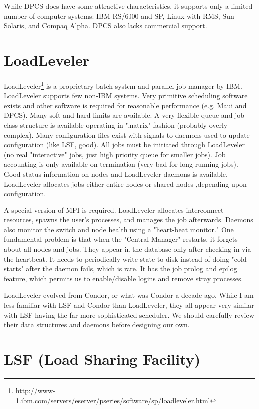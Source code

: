 \documentclass{article}
\begin{document}
While DPCS does have some attractive characteristics, it supports only a 
limited number of computer systems: IBM RS/6000 and SP, Linux with RMS, 
Sun Solaris, and Compaq Alpha. DPCS also lacks commercial support.

\section{LoadLeveler}

LoadLeveler\footnote{
http://www-1.ibm.com/servers/eserver/pseries/software/sp/loadleveler.html}
is a proprietary batch system and parallel job manager by 
IBM. LoadLeveler supports few non-IBM systems. Very primitive 
scheduling software exists and other software is required for reasonable 
performance (e.g. Maui and DPCS). Many soft and hard limits are available. 
A very flexible queue and job class structure is available operating in "matrix" fashion 
(probably overly complex). Many configuration files exist with signals to 
daemons used to update configuration (like LSF, good). All jobs must 
be initiated through LoadLeveler (no real "interactive" jobs, just 
high priority queue for smaller jobs). Job accounting is only available 
on termination (very bad for long-running jobs). Good status 
information on nodes and LoadLeveler daemons is available. LoadLeveler 
allocates jobs either entire nodes or shared nodes ,depending upon configuration.

A special version of MPI is required. LoadLeveler allocates 
interconnect resources, spawns the user's processes, and manages the 
job afterwards. Daemons also monitor the switch and node health using 
a "heart-beat monitor." One fundamental problem is that when the 
"Central Manager" restarts, it forgets about all nodes and jobs. They 
appear in the database only after checking in via the heartbeat. It 
needs to periodically write state to disk instead of doing 
"cold-starts" after the daemon fails, which is rare. It has the job 
prolog and epilog feature, which permits us to enable/disable logins 
and remove stray processes.

LoadLeveler evolved from Condor, or what was Condor a decade ago. 
While I am less familiar with LSF and Condor than LoadLeveler, they 
all appear very similar with LSF having the far more sophisticated 
scheduler. We should carefully review their data structures and 
daemons before designing our own.

\section{LSF (Load Sharing Facility)}
\end{document}
